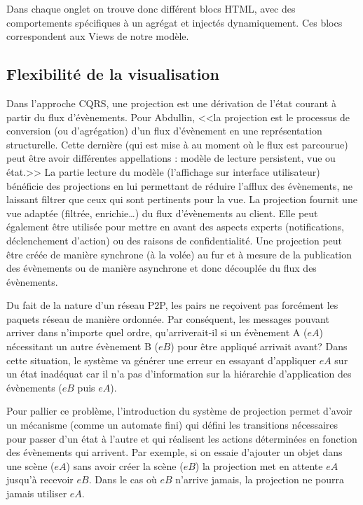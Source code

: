 Dans chaque onglet on trouve donc différent blocs \gls{HTML}, avec des 
comportements spécifiques à un agrégat et injectés dynamiquement. Ces blocs 
correspondent aux Views de notre modèle.

\subsection{Flexibilité de la visualisation}
Dans l'approche \gls{CQRS}, une projection est une dérivation de l'état courant à 
partir du flux d'évènements. Pour Abdullin, <<la projection est le processus de 
conversion (ou d'agrégation) d'un flux d'évènement en une représentation 
structurelle. Cette dernière (qui est mise à au moment où le flux est parcourue) 
peut être avoir différentes appellations : modèle de lecture persistent, vue ou 
état.>>
La partie lecture du modèle (l'affichage sur interface utilisateur) bénéficie des 
projections en lui permettant de réduire l'afflux des évènements, ne laissant filtrer 
que ceux qui sont pertinents pour la vue. La projection fournit une vue adaptée 
(filtrée, enrichie\ldots) du flux d'évènements au client. Elle peut également être 
utilisée pour mettre en avant des aspects experts (notifications, déclenchement 
d'action) ou des raisons de confidentialité.
Une projection peut être créée de manière synchrone (à la volée) au fur et à 
mesure de la publication des évènements ou de manière asynchrone et donc 
découplée du flux des évènements. 


Du fait de la nature d'un réseau \gls{P2P}, les pairs ne reçoivent pas forcément les 
paquets réseau de manière ordonnée.
Par conséquent, les messages pouvant arriver dans n'importe quel ordre, 
qu'arriverait-il si un évènement A ($eA$) nécessitant un autre évènement B ($eB$) 
pour être appliqué arrivait avant? Dans cette situation, le système va générer une 
erreur en essayant d'appliquer $eA$ sur un état inadéquat car il n'a pas 
d'information sur la hiérarchie d'application des évènements ($eB$ puis $eA$).

Pour pallier ce problème, l'introduction du système de projection permet d'avoir un 
mécanisme (comme un automate fini) qui défini les transitions nécessaires pour 
passer d'un état à l'autre et qui réalisent les actions déterminées en fonction des 
évènements qui arrivent. Par exemple, si on essaie d'ajouter un objet dans une 
scène  ($eA$) sans avoir créer la scène ($eB$) la projection met en attente $eA$ 
jusqu'à recevoir $eB$. Dans le cas où $eB$ n'arrive jamais, la projection ne pourra 
jamais utiliser $eA$.

